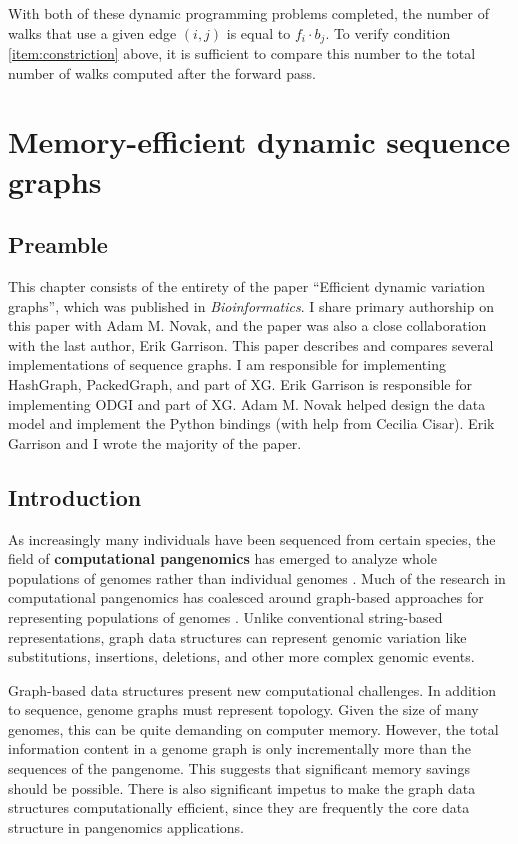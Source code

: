 \documentclass[11pt]{ucthesis}
\newcommand{\vocab}{\textbf}
\begin{document}
With both of these dynamic programming problems completed, the number of walks that use a given edge $(i,j)$ is equal to $f_i \cdot b_j$. To verify condition \ref{item:constriction} above, it is sufficient to compare this number to the total number of walks computed after the forward pass.

\chapter{Memory-efficient dynamic sequence graphs}
\label{chapter:handle}

\section{Preamble}

This chapter consists of the entirety of the paper ``Efficient dynamic variation graphs'', which was published in \emph{Bioinformatics}\cite{eizenga2020efficient}. I share primary authorship on this paper with Adam M. Novak, and the paper was also a close collaboration with the last author, Erik Garrison. This paper describes and compares several implementations of sequence graphs. I am responsible for implementing HashGraph, PackedGraph, and part of XG. Erik Garrison is responsible for implementing ODGI and part of XG. Adam M. Novak helped design the data model and implement the Python bindings (with help from Cecilia Cisar). Erik Garrison and I wrote the majority of the paper.

\section{Introduction}

As increasingly many individuals have been sequenced from certain species, the field of \vocab{computational pangenomics} has emerged to analyze whole populations of genomes rather than individual genomes \cite{computational2018computational}.  
Much of the research in computational pangenomics has coalesced around graph-based approaches for representing populations of genomes \cite{paten2017genome}.
Unlike conventional string-based representations, graph data structures can represent genomic variation like substitutions, insertions, deletions, and other more complex genomic events.

Graph-based data structures present new computational challenges.
In addition to sequence, genome graphs must represent topology.
Given the size of many genomes, this can be quite demanding on computer memory.
However, the total information content in a genome graph is only incrementally more than the sequences of the pangenome.
This suggests that significant memory savings should be possible.
There is also significant impetus to make the graph data structures computationally efficient, since they are frequently the core data structure in pangenomics applications.
\end{document}
